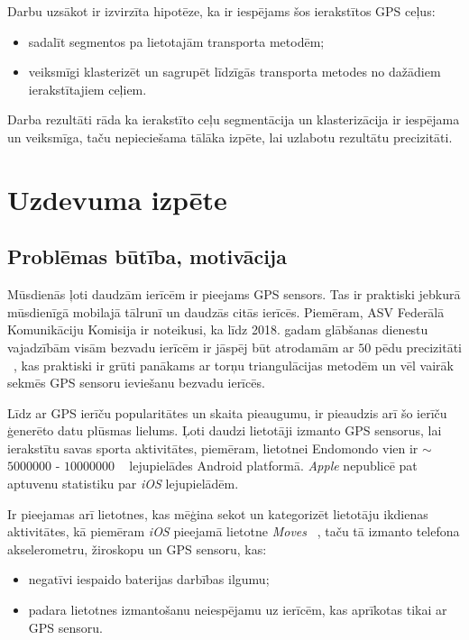 \documentclass{ludis}
\begin{document}
Darbu uzsākot ir izvirzīta hipotēze, ka ir iespējams šos ierakstītos GPS ceļus:
\begin{itemize}
\item sadalīt segmentos pa lietotajām transporta metodēm;
\item veiksmīgi klasterizēt un sagrupēt līdzīgās transporta metodes no dažā\-diem ierakstītajiem ceļiem.
\end{itemize}


Darba rezultāti rāda ka ierakstīto ceļu segmentācija un klasterizācija ir iespējama un veiksmīga,
taču nepieciešama tālāka izpēte, lai uzlabotu rezultātu precizitāti.

\chapter{Uzdevuma izpēte}
\section{Problēmas būtība, motivācija}
Mūsdienās ļoti daudzām ierīcēm ir pieejams GPS sensors. Tas ir praktiski jebkurā mūsdienīgā mobilajā
tālrunī un daudzās citās ierīcēs. Piemēram, ASV Federālā Komunikāciju Komisija ir noteikusi, ka līdz
2018. gadam glāb\-šanas dienestu vajadzībām visām bezvadu ierīcēm ir jāspēj būt atrodamām 
ar $50$ pēdu precizitāti ~\cite{fcc_e911}, kas praktiski ir grūti panākams ar torņu trian\-gulācijas 
metodēm un vēl vairāk sekmēs GPS sensoru ieviešanu bezvadu ierīcēs.

Līdz ar GPS ierīču popularitātes un skaita pieaugumu, ir pieaudzis arī šo ierīču ģenerēto datu
plūsmas lielums. Ļoti daudzi lietotāji izmanto GPS sensorus, lai ierakstītu savas sporta aktivitātes,
piemēram, lietotnei Endo\-mondo vien ir $\sim$ $5000000$ - $10000000$ ~\cite{g_play_endomondo} 
lejupielādes Android platformā. \emph{Apple} nepublicē pat aptuvenu statistiku par \emph{iOS}
lejupielādēm.

Ir pieejamas arī lietotnes, kas mēģina sekot un kategorizēt lietotāju \linebreak ikdienas 
aktivitātes, kā piemēram \emph{iOS} pieejamā lietotne \emph{Moves} ~\cite{moves_app}, taču tā 
izmanto telefona akselerometru, žiroskopu un GPS sensoru, kas:
\begin{itemize}
\item negatīvi iespaido baterijas darbības ilgumu;
\item padara lietotnes izmantošanu neiespējamu uz ierīcēm, kas aprīkotas tikai ar GPS sensoru.
\end{itemize}
\end{document}
